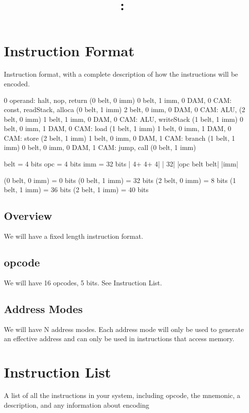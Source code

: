 \documentclass{article}
\title{
    \vspace{2in}
    \textmd{\textbf{\hmwkClass:\ \hmwkTitle}}\\
    \vspace{3in}
}
\author{\hmwkAuthorName}
\date{}
\begin{document}
\maketitle

\pagebreak

\section{Instruction Format}
Instruction format, with a complete description of how the instructions will be encoded.

0 operand: halt, nop, return                            (0 belt, 0 imm)
0 belt, 1 imm, 0 DAM, 0 CAM: const, readStack, alloca   (0 belt, 1 imm)
2 belt, 0 imm, 0 DAM, 0 CAM: ALU,                       (2 belt, 0 imm)
1 belt, 1 imm, 0 DAM, 0 CAM: ALU, writeStack            (1 belt, 1 imm)
0 belt, 0 imm, 1 DAM, 0 CAM: load                       (1 belt, 1 imm)
1 belt, 0 imm, 1 DAM, 0 CAM: store                      (2 belt, 1 imm)
1 belt, 0 imm, 0 DAM, 1 CAM: branch                     (1 belt, 1 imm)
0 belt, 0 imm, 0 DAM, 1 CAM: jump, call                 (0 belt, 1 imm)

belt = 4 bits
opc = 4 bits
imm = 32 bits
|  4+   4+   4| | 32|
|opc belt belt| |imm|

(0 belt, 0 imm) = 0 bits
(0 belt, 1 imm) = 32 bits
(2 belt, 0 imm) = 8 bits
(1 belt, 1 imm) = 36 bits
(2 belt, 1 imm) = 40 bits


\subsection{Overview}
We will have a fixed length instruction format.
\subsection{opcode}
We will have 16 opcodes, 5 bits. See Instruction List.
\subsection{Address Modes}
We will have N address modes.
Each address mode will only be used to generate an effective address and can only be used in instructions that access memory.


\section{Instruction List}
A list of all the instructions in your system, including opcode, the mnemonic, a description, and any information about encoding
\end{document}
